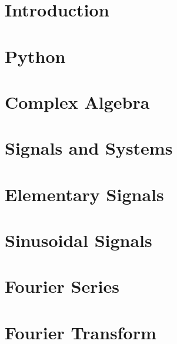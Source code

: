 \documentclass{tufte-book}
\begin{document}
\chapter{Introduction}

\fi

\ifSpPython
\chapter{Python} 


 \ifSpExerciseSol
   
 \fi
\fi

\ifSpComplex
\chapter{Complex Algebra}


 \ifSpExerciseSol
 
 \fi
\fi

\ifSpSigSys
\chapter{Signals and Systems}


 \ifSpExerciseSol
 
 \fi
\fi

\ifSpElSig
\chapter{Elementary Signals}


 \ifSpExerciseSol
 
 \fi
\fi

\ifSpSin
\chapter{Sinusoidal Signals}


 \ifSpExerciseSol
 
 \fi
\fi

\ifSpdB

\fi

\ifSpFourierSer
\chapter{Fourier Series}


 \ifSpExerciseSol
 
 \fi



\fi

\ifSpProgA

\fi

\ifSpFourierTra
\chapter{Fourier Transform}


 \ifSpExerciseSol
 
 \fi


\fi
\end{document}
